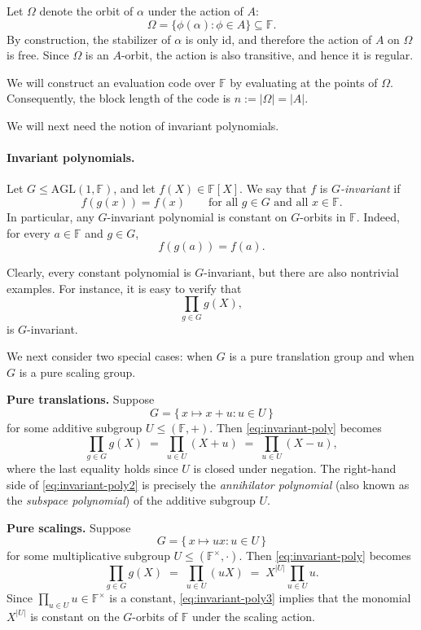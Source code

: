 \documentclass[11pt]{article}
\theoremstyle{plain}
\theoremstyle{definition}
\begin{document}
Let $\Omega$ denote the orbit of $\alpha$ under the action of $A$:
\[
\Omega=\{\phi(\alpha): \phi\in A\}\subseteq \mathbb{F}.
\]
By construction, the stabilizer of $\alpha$ is only $\mathrm{id}$, and therefore the action of $A$ on $\Omega$ is free. Since $\Omega$ is an $A$-orbit, the action is also transitive, and hence it is regular. 

We will construct an evaluation code over $\mathbb{F}$ by evaluating at the points of $\Omega$. Consequently, the block length of the code is
$
n := |\Omega| = |A|.
$

We will next need the notion of invariant polynomials.
 
\paragraph{Invariant polynomials.}
Let $G \le \mathrm{AGL}(1,\mathbb{F})$, and let $f(X)\in \mathbb{F}[X]$. We say that $f$ is \emph{$G$-invariant} if
\[
f(g(x)) = f(x)\qquad\text{for all } g\in G\text{ and all } x\in\mathbb{F}.
\]
In particular, any $G$-invariant polynomial is constant on $G$-orbits in $\mathbb{F}$. Indeed, for every $a\in \mathbb{F}$ and $g\in G$,
\[
f(g(a)) = f(a).
\]

Clearly, every constant polynomial is $G$-invariant, but there are also nontrivial examples. For instance, it is easy to verify  that
\begin{equation}
\label{eq:invariant-poly}
\prod_{g\in G} g(X),
\end{equation}
is $G$-invariant.

We next consider two special cases: when $G$ is a pure translation group and when $G$ is a pure scaling group.

\smallskip
\noindent\textbf{Pure translations.}
Suppose
\[
G=\{\,x\mapsto x+u : u\in U\,\}
\]
for some additive subgroup $U\le (\mathbb{F},+)$. Then \eqref{eq:invariant-poly} becomes
\begin{equation}
\label{eq:invariant-poly2}
\prod_{g\in G} g(X) \;=\; \prod_{u\in U} (X+u) \;=\; \prod_{u\in U}(X-u),
\end{equation}
where the last equality holds since $U$ is closed under negation. The right-hand side of \eqref{eq:invariant-poly2} is precisely the \emph{annihilator polynomial} (also known as the \emph{subspace polynomial}) of the additive subgroup $U$.

\smallskip
\noindent\textbf{Pure scalings.}
Suppose
\[
G=\{\,x\mapsto ux : u\in U\,\}
\]
for some multiplicative subgroup $U\le (\mathbb{F}^\times,\cdot)$. Then \eqref{eq:invariant-poly} becomes
\begin{equation}
\label{eq:invariant-poly3}
\prod_{g\in G} g(X)
\;=\;
\prod_{u\in U} (uX)
\;=\;
X^{|U|}\prod_{u\in U} u.
\end{equation}
Since $\prod_{u\in U}u\in \mathbb{F}^\times$ is a constant, \eqref{eq:invariant-poly3} implies that the monomial $X^{|U|}$ is constant on the $G$-orbits of $\mathbb{F}$ under the scaling action.
\end{document}
